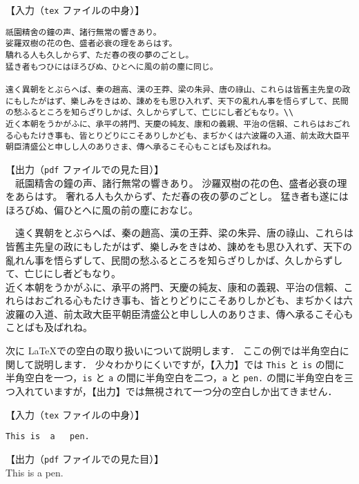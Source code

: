 \begin{tcolorbox}[enhanced, title=改行・改段落, drop fuzzy shadow]
【入力（\verb|tex| ファイルの中身）】
\begin{verbatim}
祇園精舍の鐘の声、諸行無常の響きあり。
娑羅双樹の花の色、盛者必衰の理をあらはす。
驕れる人も久しからず、ただ春の夜の夢のごとし。
猛き者もつひにはほろびぬ、ひとへに風の前の塵に同じ。

遠く異朝をとぶらへば、秦の趙高、漢の王莽、梁の朱异、唐の祿山、これらは皆舊主先皇の政にもしたがはず、樂しみをきはめ、諌めをも思ひ入れず、天下の亂れん事を悟らずして、民間の愁ふるところを知らざりしかば、久しからずして、亡じにし者どもなり。\\
近く本朝をうかがふに、承平の將門、天慶の純友、康和の義親、平治の信賴、これらはおごれる心もたけき事も、皆とりどりにこそありしかども、まぢかくは六波羅の入道、前太政大臣平朝臣清盛公と申しし人のありさま、傳へ承るこそ心もことばも及ばれね。
\end{verbatim}
\tcblower
【出力（\verb|pdf| ファイルでの見た目）】\\
　祇園精舎の鐘の声、諸行無常の響きあり。
沙羅双樹の花の色、盛者必衰の理をあらはす。
奢れる人も久からず、ただ春の夜の夢のごとし。
猛き者も遂にはほろびぬ、偏ひとへに風の前の塵におなじ。

　遠く異朝をとぶらへば、秦の趙高、漢の王莽、梁の朱异、唐の祿山、これらは皆舊主先皇の政にもしたがはず、樂しみをきはめ、諌めをも思ひ入れず、天下の亂れん事を悟らずして、民間の愁ふるところを知らざりしかば、久しからずして、亡じにし者どもなり。\\
近く本朝をうかがふに、承平の將門、天慶の純友、康和の義親、平治の信賴、これらはおごれる心もたけき事も、皆とりどりにこそありしかども、まぢかくは六波羅の入道、前太政大臣平朝臣清盛公と申しし人のありさま、傳へ承るこそ心もことばも及ばれね。
\end{tcolorbox}

次に \LaTeX での空白の取り扱いについて説明します．
ここの例では半角空白に関して説明します．
少々わかりにくいですが，【入力】では \verb|This| と \verb|is| の間に半角空白を一つ，\verb|is| と \verb|a| の間に半角空白を二つ，\verb|a| と \verb|pen.| の間に半角空白を三つ入れていますが，【出力】では無視されて一つ分の空白しか出てきません．

\begin{tcolorbox}[enhanced, title=空白の処理, drop fuzzy shadow]
【入力（\verb|tex| ファイルの中身）】
\begin{verbatim}
This is  a   pen.
\end{verbatim}
\tcblower
【出力（\verb|pdf| ファイルでの見た目）】\\
This is a pen.
\end{tcolorbox}

